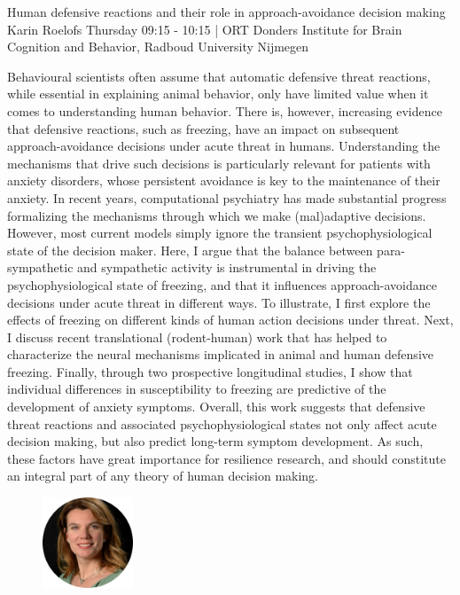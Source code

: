 
\begin{keynote}
    {Human defensive reactions and their role in approach-avoidance decision making}
    {Karin Roelofs}
    {Thursday 09:15 - 10:15 | ORT}
    {Donders Institute for Brain Cognition and Behavior, Radboud University Nijmegen}

    Behavioural scientists often assume that automatic defensive threat reactions, while essential in explaining animal behavior, only have limited value when it comes to understanding human behavior. There is, however, increasing evidence that defensive reactions, such as freezing, have an impact on subsequent approach-avoidance decisions under acute threat in humans. Understanding the mechanisms that drive such decisions is particularly relevant for patients with anxiety disorders, whose persistent avoidance is key to the maintenance of their anxiety. In recent years, computational psychiatry has made substantial progress formalizing the mechanisms through which we make (mal)adaptive decisions. However, most current models simply ignore the transient psychophysiological state of the decision maker. Here, I argue that the balance between para-sympathetic and sympathetic activity is instrumental in driving the psychophysiological state of freezing, and that it influences approach-avoidance decisions under acute threat in different ways. To illustrate, I first explore the effects of freezing on different kinds of human action decisions under threat. Next, I discuss recent translational (rodent-human) work that has helped to characterize the neural mechanisms implicated in animal and human defensive freezing. Finally, through two prospective longitudinal studies, I show that individual differences in susceptibility to freezing are predictive of the development of anxiety symptoms. 
    Overall, this work suggests that defensive threat reactions and associated psychophysiological states not only affect acute decision making, but also predict long-term symptom development. As such, these factors have great importance for resilience research, and should constitute an integral part of any theory of human decision making.

    \vspace*{1cm}

    \begin{figure}[H]
        \raggedleft
        \includegraphics[width=0.24\textwidth]{tex/images/keynote_speaker/roeloefs_cropped.png}
    \end{figure}

\end{keynote}
